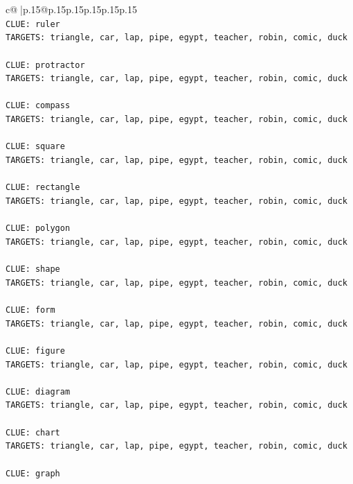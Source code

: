 \documentclass{article}
\begin{document}
{\begin{supertabular}{c@{$\;$}|p{.15\linewidth}@{}p{.15\linewidth}p{.15\linewidth}p{.15\linewidth}p{.15\linewidth}p{.15\linewidth}}
{{{\\ 
\texttt{CLUE: ruler} \\
\texttt{TARGETS: triangle, car, lap, pipe, egypt, teacher, robin, comic, duck} \\
\\ 
\texttt{CLUE: protractor} \\
\texttt{TARGETS: triangle, car, lap, pipe, egypt, teacher, robin, comic, duck} \\
\\ 
\texttt{CLUE: compass} \\
\texttt{TARGETS: triangle, car, lap, pipe, egypt, teacher, robin, comic, duck} \\
\\ 
\texttt{CLUE: square} \\
\texttt{TARGETS: triangle, car, lap, pipe, egypt, teacher, robin, comic, duck} \\
\\ 
\texttt{CLUE: rectangle} \\
\texttt{TARGETS: triangle, car, lap, pipe, egypt, teacher, robin, comic, duck} \\
\\ 
\texttt{CLUE: polygon} \\
\texttt{TARGETS: triangle, car, lap, pipe, egypt, teacher, robin, comic, duck} \\
\\ 
\texttt{CLUE: shape} \\
\texttt{TARGETS: triangle, car, lap, pipe, egypt, teacher, robin, comic, duck} \\
\\ 
\texttt{CLUE: form} \\
\texttt{TARGETS: triangle, car, lap, pipe, egypt, teacher, robin, comic, duck} \\
\\ 
\texttt{CLUE: figure} \\
\texttt{TARGETS: triangle, car, lap, pipe, egypt, teacher, robin, comic, duck} \\
\\ 
\texttt{CLUE: diagram} \\
\texttt{TARGETS: triangle, car, lap, pipe, egypt, teacher, robin, comic, duck} \\
\\ 
\texttt{CLUE: chart} \\
\texttt{TARGETS: triangle, car, lap, pipe, egypt, teacher, robin, comic, duck} \\
\\ 
\texttt{CLUE: graph} \\
}}}
\end{supertabular}}
\end{document}

